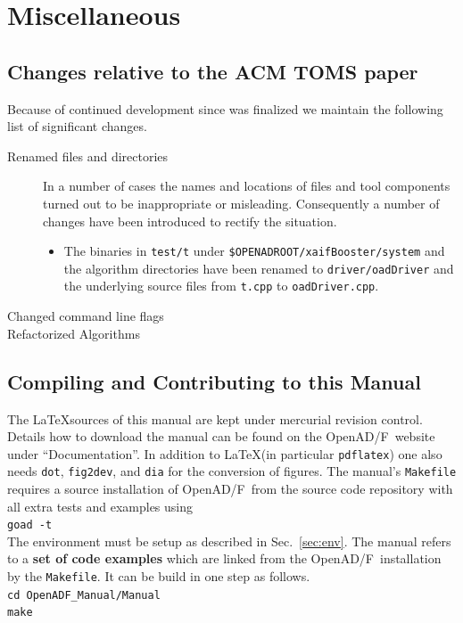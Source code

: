 \documentclass{book}
\newcommand{\OpenADF}{OpenAD/F}
\newcommand{\refsec}[1]{{Sec.~\ref{#1}}}
\begin{document}
\chapter{Miscellaneous}\label{sec:misc}
\section{Changes relative to the ACM TOMS paper}\label{sec:changesSinceTOMS}
Because of continued development since \cite{openadTOMS} was finalized 
we maintain the following list of significant changes.
\begin{description} 
\item[Renamed files and directories] In a number of cases the names and locations of files and 
tool components turned out to be inappropriate or misleading. Consequently a number of changes 
have been introduced to rectify the situation.  
{
\begin{itemize}
\item The binaries in \lstinline{test/t} under \lstinline{$OPENADROOT/xaifBooster/system} %
and the algorithm directories have been renamed to \lstinline{driver/oadDriver} and the 
underlying source files from \lstinline{t.cpp} to \lstinline{oadDriver.cpp}.
\end{itemize}
}
\item[Changed command line flags]
\item[Refactorized Algorithms]
\end{description}
\section{Compiling and Contributing to this Manual}\label{sec:compilingManual}
The \LaTeX  sources of this manual are kept under 
mercurial revision control. Details how to download 
the manual can be found on the \OpenADF\ website under ``Documentation''.  
In addition to \LaTeX  (in particular \lstinline{pdflatex}) 
one also needs \lstinline{dot}, \lstinline{fig2dev}, and 
\lstinline{dia} for the conversion of figures. 
The manual's \lstinline{Makefile} requires a source installation of \OpenADF\
from the source code repository with all extra tests and examples using \\[1ex]
\hspace*{.3cm}\lstinline{goad -t}\\[1ex]
The environment must be setup as described in \refsec{sec:env}.
The manual refers to a {\bf set of code examples} which are 
linked from the \OpenADF\ installation by the \lstinline{Makefile}.
It can be build in one step as follows.\\[1ex]
\hspace*{.3cm}\lstinline{cd OpenADF_Manual/Manual}\\
\hspace*{.3cm}\lstinline{make}\\[1ex]
   
\end{document}
